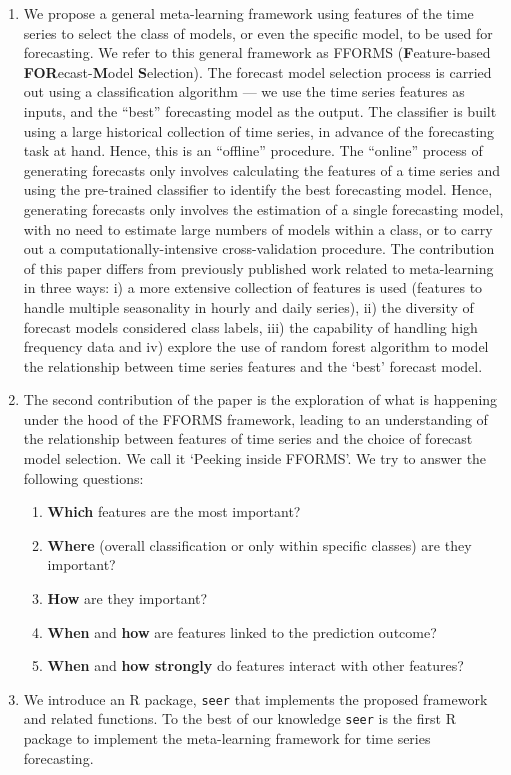 \documentclass[11pt,a4paper,]{article}
\providecommand{\tightlist}{%
  \setlength{\itemsep}{0pt}\setlength{\parskip}{0pt}}
\begin{document}
\begin{enumerate}
\def\labelenumi{\arabic{enumi}.}
\item
  We propose a general meta-learning framework using features of the time series to select the class of models, or even the specific model, to be used for forecasting. We refer to this general framework as FFORMS (\textbf{F}eature-based \textbf{FOR}ecast-\textbf{M}odel \textbf{S}election). The forecast model selection process is carried out using a classification algorithm --- we use the time series features as inputs, and the ``best'' forecasting model as the output. The classifier is built using a large historical collection of time series, in advance of the forecasting task at hand. Hence, this is an ``offline'' procedure. The ``online'' process of generating forecasts only involves calculating the features of a time series and using the pre-trained classifier to identify the best forecasting model. Hence, generating forecasts only involves the estimation of a single forecasting model, with no need to estimate large numbers of models within a class, or to carry out a computationally-intensive cross-validation procedure. The contribution of this paper differs from previously published work related to meta-learning \autocites{prudencio2004meta}{lemke2010meta}{kuck2016meta} in three ways: i) a more extensive collection of features is used (features to handle multiple seasonality in hourly and daily series), ii) the diversity of forecast models considered class labels, iii) the capability of handling high frequency data and iv) explore the use of random forest algorithm to model the relationship between time series features and the `best' forecast model.
\item
  The second contribution of the paper is the exploration of what is happening under the hood of the FFORMS framework, leading to an understanding of the relationship between features of time series and the choice of forecast model selection. We call it `Peeking inside FFORMS'. We try to answer the following questions:

  \begin{enumerate}
  \def\labelenumii{\roman{enumii})}
  \tightlist
  \item
    \textbf{Which} features are the most important?
  \item
    \textbf{Where} (overall classification or only within specific classes) are they important?
  \item
    \textbf{How} are they important?
  \item
    \textbf{When} and \textbf{how} are features linked to the prediction outcome?
  \item
    \textbf{When} and \textbf{how strongly} do features interact with other features?
  \end{enumerate}
\item
  We introduce an R \autocite{Rcore} package, \texttt{seer} \autocite{seer} that implements the proposed framework and related functions. To the best of our knowledge \texttt{seer} is the first R package to implement the meta-learning framework for time series forecasting.
\end{enumerate}
\end{document}
